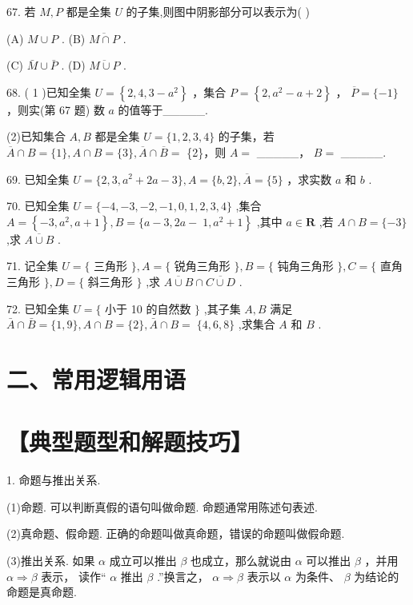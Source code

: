 \documentclass[10pt]{article}
\begin{document}
67. 若 \(M,P\) 都是全集 \(U\) 的子集,则图中阴影部分可以表示为( )

(A) \(M \cup  P\) . (B) \(\overline{M \cap  P}\) .

(C) \(\bar{M} \cup  \bar{P}\) . (D) \(\overline{M \cup  P}\) .

68. ( 1 )已知全集 \(U = \left\{  {2,4,3 - {a}^{2}}\right\}\) ，集合 \(P = \left\{  {2,{a}^{2} - a + 2}\right\}\) ， \(\overline{P} = \{  - 1\}\) ，则实(第 67 题) 数 \(a\) 的值等于\_\_\_\_\_.

(2)已知集合 \(A,B\) 都是全集 \(U = \{ 1,2,3,4\}\) 的子集，若 \(\overline{A} \cap  B = \{ 1\} ,A \cap  B = \{ 3\} ,\overline{A} \cap  \overline{B} =\) \{2\}，则 \(A =\) \_\_\_\_\_， \(B =\) \_\_\_\_\_.

69. 已知全集 \(U = \{ 2,3,{a}^{2} + {2a} - 3\} ,A = \{ b,2\} ,\overline{A} = \{ 5\}\) ，求实数 \(a\) 和 \(b\) .

70. 已知全集 \(U = \{  - 4, - 3, - 2, - 1,0,1,2,3,4\}\) ,集合 \(A = \left\{  {-3,{a}^{2},a + 1}\right\}  ,B = \{ a - 3,{2a} - \; \left. {1,{a}^{2} + 1}\right\}\) ,其中 \(a \in  \mathbf{R}\) ,若 \(A \cap  B = \{  - 3\}\) ,求 \(\overline{A \cup  B}\) .

71. 记全集 \(U = \{\) 三角形 \(\} ,A = \{\) 锐角三角形 \(\} ,B = \{\) 钝角三角形 \(\} ,C = \{\) 直角三角形 \(\} ,D = \{\) 斜三角形 \(\}\) ,求 \(\overline{A \cup  B} \cap  \overline{C \cup  D}\) .

72. 已知全集 \(U = \{\) 小于 10 的自然数 \(\}\) ,其子集 \(A,B\) 满足 \(\bar{A} \cap  \bar{B} = \{ 1,9\} ,A \cap  B = \{ 2\} ,\bar{A} \cap  B = \; \{ 4,6,8\}\) ,求集合 \(A\) 和 \(B\) .

\section*{二、常用逻辑用语}

\section*{【典型题型和解题技巧】}

1. 命题与推出关系.

(1)命题. 可以判断真假的语句叫做命题. 命题通常用陈述句表述.

(2)真命题、假命题. 正确的命题叫做真命题，错误的命题叫做假命题.

(3)推出关系. 如果 \(\alpha\) 成立可以推出 \(\beta\) 也成立，那么就说由 \(\alpha\) 可以推出 \(\beta\) ，并用 \(\alpha  \Rightarrow  \beta\) 表示， 读作“ \(\alpha\) 推出 \(\beta\) .”换言之， \(\alpha  \Rightarrow  \beta\) 表示以 \(\alpha\) 为条件、 \(\beta\) 为结论的命题是真命题.
\end{document}
